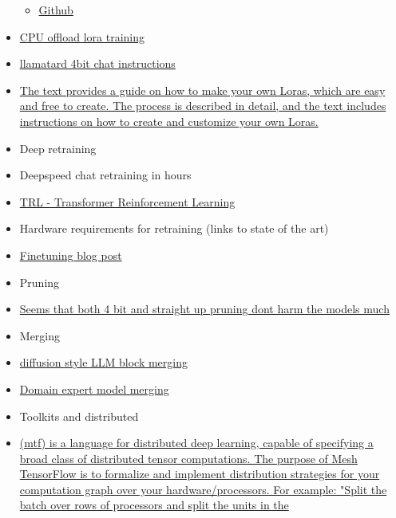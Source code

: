 \begin{itemize}
  \begin{itemize}
   
  \item
    \href{https://github.com/tloen/alpaca-lora}{Github}
  \end{itemize}
\item
  \href{https://github.com/oobabooga/text-generation-webui/commit/09d8119e3cf36257496acfb44e6445a9f40c3d02}{CPU
  offload lora training}
\item
  \href{https://rentry.org/llama-tard-v2\#llama-int8-4bit-chatbot-guide-v2}{llamatard
  4bit chat instructions}
\item
  \href{https://civitai.com/models/22530}{The text provides a guide on
  how to make your own Loras, which are easy and free to create. The
  process is described in detail, and the text includes instructions on
  how to create and customize your own Loras.}
\item
  Deep retraining
\item
  Deepspeed chat retraining in hours
\item
  \href{https://github.com/lvwerra/trl}{TRL - Transformer Reinforcement
  Learning}
\item
  Hardware requirements for retraining (links to state of the art)
\item
  \href{https://www.databricks.com/blog/2023/03/20/fine-tuning-large-language-models-hugging-face-and-deepspeed.html}{Finetuning
  blog post}
\item
  Pruning
\item
  \href{https://arxiv.org/abs/1803.03635}{Seems that both 4 bit and
  straight up pruning don\textquotesingle t harm the models much}
\item
  Merging
\item
  \href{https://github.com/TehVenomm/LM_Transformers_BlockMerge}{diffusion
  style LLM block merging}
\item
  \href{https://docs.google.com/document/d/1JCzJ1wdBMBVwsFW4CWGUbX-YEDXB0yS4mfFbvwPLQrI/edit}{Domain
  expert model merging}
\item
  Toolkits and distributed
\item
  \href{https://github.com/tensorflow/mesh}{                (mtf) is a
  language for distributed deep learning, capable of specifying a broad
  class of distributed tensor computations. The purpose of Mesh
  TensorFlow is to formalize and implement distribution strategies for
  your computation graph over your hardware/processors. For example:
  "Split the batch over rows of processors and split the units in the
}
\end{itemize}
